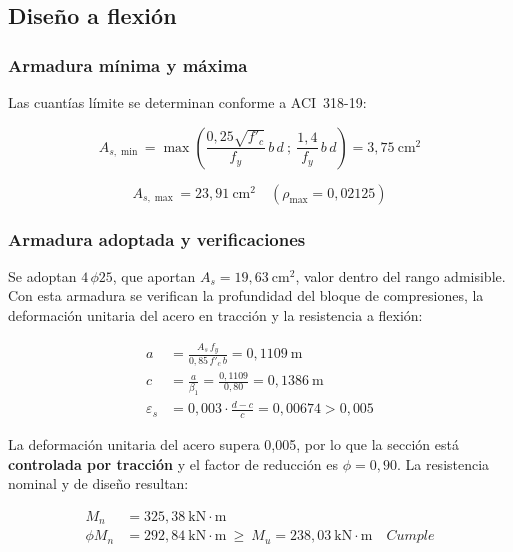 \subsection{Diseño a flexión}
 
\subsubsection{Armadura mínima y máxima}
 
Las cuantías límite se determinan conforme a ACI~318-19:
 
\begin{equation}
    A_{s,\min} = \max\!\left(\frac{0{,}25\sqrt{f'_c}}{f_y}\,b\,d\ ;\ \frac{1{,}4}{f_y}\,b\,d\right) = 3{,}75\ \text{cm}^2
\end{equation}
 
\begin{equation}
    A_{s,\max} = 23{,}91\ \text{cm}^2 \quad (\rho_{\max} = 0{,}02125)
\end{equation}
 
\subsubsection{Armadura adoptada y verificaciones}
 
Se adoptan $4\,\phi 25$, que aportan $A_s = 19{,}63\ \text{cm}^2$, valor dentro del rango admisible. Con esta armadura se verifican la profundidad del bloque de compresiones, la deformación unitaria del acero en tracción y la resistencia a flexión:
 
\begin{align}
    a &= \frac{A_s\,f_y}{0{,}85\,f'_c\,b} = 0{,}1109\ \text{m} \\
    c &= \frac{a}{\beta_1} = \frac{0{,}1109}{0{,}80} = 0{,}1386\ \text{m} \\
    \varepsilon_s &= 0{,}003\cdot\frac{d - c}{c} = 0{,}00674 > 0{,}005
\end{align}
 
La deformación unitaria del acero supera 0{,}005, por lo que la sección está \textbf{controlada por tracción} y el factor de reducción es $\phi = 0{,}90$. La resistencia nominal y de diseño resultan:
 
\begin{align}
    M_n &= 325{,}38\ \text{kN}{\cdot}\text{m} \\
    \phi M_n &= 292{,}84\ \text{kN}{\cdot}\text{m}\ \geq\ M_u = 238{,}03\ \text{kN}{\cdot}\text{m} \quad Cumple
\end{align}
 
